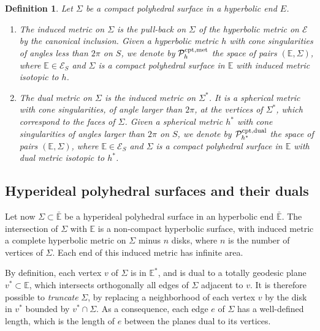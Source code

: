 \documentclass[notitlepage,twoside,a4paper]{amsart}
\newcommand{\Pcomet}{\cP^{\rm cpt,met}_{h}}
\newcommand{\Pcodua}{\cP^{\rm cpt,dual}_{h^*}}
\newtheorem{definition}[theorem]{\rm\bf Definition}
\theoremstyle{named}
\newcommand{\bE}{{\mathbb E}}
\newcommand{\cE}{{\mathcal E}}
\newcommand{\cP}{{\mathcal P}}
\begin{document}
\begin{definition} \label{df:metrics-compact}
  Let $\Sigma$ be a compact polyhedral surface in a hyperbolic end $E$.
  \begin{enumerate}
  \item The {\em induced metric} on $\Sigma$ is the pull-back on $\Sigma$ of the hyperbolic metric on $\cE$ by the canonical inclusion. Given a hyperbolic metric $h$ with cone singularities of angles less than $2\pi$ on $S$, we denote by $\Pcomet$ the space of pairs $(\bE,\Sigma)$, where $\bE\in \cE_S$ and $\Sigma$ is a compact polyhedral surface in $\bE$ with induced metric isotopic to $h$.
  \item The {\em dual metric} on $\Sigma$ is the induced metric on $\Sigma^*$. It is a spherical metric with cone singularities, of angle larger than $2\pi$, at the vertices of $\Sigma^*$, which correspond to the faces of $\Sigma$. Given a spherical metric $h^*$ with cone singularities of angles larger than $2\pi$ on $S$, we denote by $\Pcodua$ the space of pairs $(\bE,\Sigma)$, where $\bE\in \cE_S$ and $\Sigma$ is a compact polyhedral surface in $\bE$ with dual metric isotopic to $h^*$.
  \end{enumerate}
\end{definition}


\subsection{Hyperideal polyhedral surfaces and their duals}
\label{ssc:hyperideal}

Let now $\Sigma\subset \bar\bE$ be a hyperideal polyhedral surface in an hyperbolic end $\bar\bE$. The intersection of $\Sigma$ with $\bE$ is a non-compact hyperbolic surface, with induced metric a complete hyperbolic metric on $\Sigma$ minus $n$ disks, where $n$ is the number of vertices of $\Sigma$. Each end of this induced metric has infinite area.

By definition, each vertex $v$ of $\Sigma$ is in $\bE^*$, and is dual to a totally geodesic plane $v^*\subset \bE$, which intersects orthogonally all edges of $\Sigma$ adjacent to $v$. It is therefore possible to {\em truncate} $\Sigma$, by replacing a neighborhood of each vertex $v$ by the disk in $v^*$ bounded by $v^*\cap \Sigma$. As a consequence, each edge $e$ of $\Sigma$ has a well-defined length, which is the length of $e$ between the planes dual to its vertices.
\end{document}
